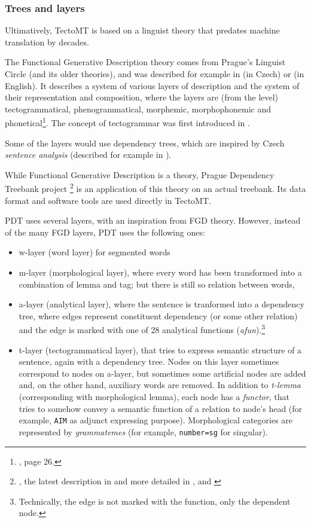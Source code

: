 \subsubsection{Trees and layers}
Ultimatively, TectoMT is based on a linguist theory that predates machine translation by decades.

The Functional Generative Description theory comes from Prague's Linguist Circle (and its older theories), and was described for example in \cite{sgallczech} (in Czech) or \cite{sgallenglish} (in English). It describes a system of various layers of description and the system of their representation and composition, where the layers are (from the  level) tectogrammatical, phenogrammatical, morphemic, morphophonemic and phonetical\footnote{\cite{sgallenglish}, page 26.}. The concept of tectogrammar was first introduced in \cite{curry}.

Some of the layers would use dependency trees, which are inspired by Czech \emph{sentence analysis} (described for example in \cite{smilauer}).

While Functional Generative Description is a theory, Prague Dependency Treebank project \footnote{\cite{pdt_soft}, the latest description in \cite{pdt_desc} and more detailed in \cite{pdt_manual_a}, \cite{pdt_manual_m} and \cite{pdt_manual_t}} is an application of this theory on an actual treebank. Its data format and software tools are used directly in TectoMT.

PDT uses several layers, with an inspiration from FGD theory. However, instead of the many FGD layers, PDT uses the following ones:
\begin{itemize}
\item w-layer (word layer) for segmented words
\item m-layer (morphological layer), where every word has been transformed into a combination of lemma and tag; but there is still so relation between words,
\item a-layer (analytical layer), where the sentence is tranformed into a dependency tree, where edges represent constituent dependency (or some other relation) and the edge is marked with one of 28 analytical functions (\emph{afun}).\footnote{Technically, the edge is not marked with the function, only the dependent node.}
\item t-layer (tectogrammatical layer), that tries to express semantic structure of a sentence, again with a dependency tree. Nodes on this layer sometimes correspond to nodes on a-layer, but sometimes some artificial nodes are added and, on the other hand, auxiliary words are removed. In addition to \emph{t-lemma} (corresponding with morphological lemma), each node has a \emph{functor}, that tries to somehow convey a semantic function of a relation to node's head (for example, \texttt{AIM} as adjunct expressing purpose). Morphological categories are represented by \emph{grammatemes} (for example, \texttt{number=sg} for singular).
\end{itemize}

